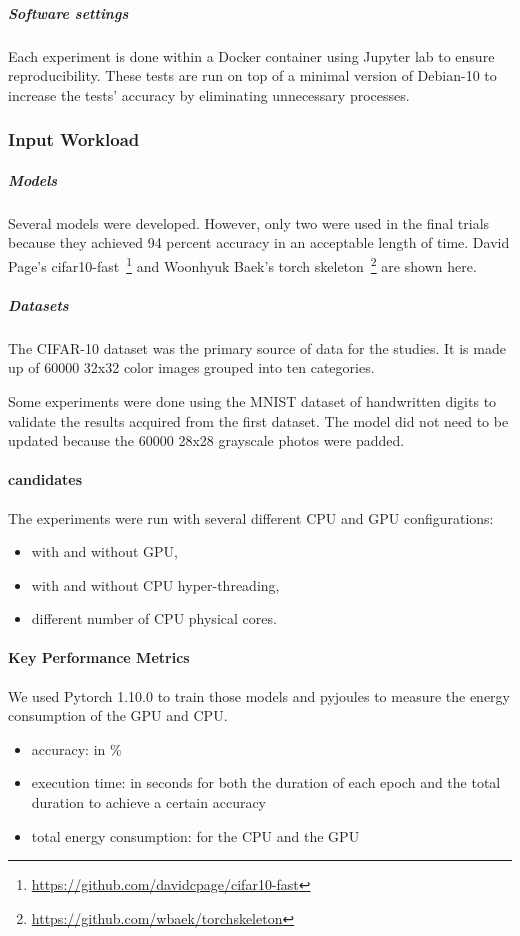 \subparagraph{Software settings}
Each experiment is done within a Docker container using Jupyter lab to ensure reproducibility. These tests are run on top of a minimal version of Debian-10 to increase the tests' accuracy by eliminating unnecessary processes.
\subsubsection{Input Workload}
\subparagraph{Models}
Several models were developed. However, only two were used in the final trials because they achieved 94 percent accuracy in an acceptable length of time.
David Page's cifar10-fast~\footnote{\url{https://github.com/davidcpage/cifar10-fast}} and Woonhyuk Baek's torch skeleton~\footnote{\url{https://github.com/wbaek/torchskeleton}} are shown here.

\subparagraph{Datasets}
The CIFAR-10 dataset was the primary source of data for the studies.
It is made up of 60000 32x32 color images grouped into ten categories.

Some experiments were done using the MNIST dataset of handwritten digits to validate the results acquired from the first dataset.
The model did not need to be updated because the 60000 28x28 grayscale photos were padded.


\paragraph{candidates}
The experiments were run with several different CPU and GPU configurations:
\begin{itemize}
    \item with and without GPU,
    \item with and without CPU hyper-threading,
    \item different number of CPU physical cores.
\end{itemize}

\paragraph{Key Performance Metrics}
We used Pytorch 1.10.0 to train those models and pyjoules to measure the energy consumption of the GPU and CPU.
\begin{itemize}
    \item accuracy: in \%
    \item execution time: in seconds for both the duration of each epoch and the total duration to achieve a certain accuracy
    \item total energy consumption: for the CPU and the  GPU
\end{itemize}


